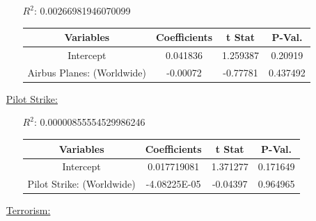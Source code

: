\documentclass[12pt]{report}
\begin{document}
\begin{enumerate}
\begin{samepage}
        \begin{enumerate}
            \item[$R^2$:]0.00266981946070099
            \item[]
                \begin{tabular}{|c|c|c|c|}

                \toprule \hline
                \textbf{Variables} & \textbf{Coefficients}  & \textbf{t Stat}& \textbf{P-Val.} \\ \hline

                Intercept & 0.041836 &  1.259387 &0.20919 \\ \hline
                Airbus Planes: (Worldwide) & -0.00072 &  -0.77781&0.437492 & \\ \hline
                \bottomrule
                \end{tabular}

        \end{enumerate}
\end{samepage}
    \item[\underline{Pilot Strike:}]
 \begin{samepage}


        \begin{enumerate}
            \item[$R^2$:]0.00000855554529986246
            \item[]
                \begin{tabular}{|c|c|c|c|}



        \toprule \hline
        \textbf{Variables} & \textbf{Coefficients}  & \textbf{t Stat} & \textbf{P-Val.}\\ \hline

        Intercept & 0.017719081 &  1.371277&0.171649 \\ \hline
        Pilot Strike: (Worldwide) & -4.08225E-05  & -0.04397 &0.964965 \\ \hline
        \bottomrule

                \end{tabular}

        \end{enumerate}
\end{samepage}

    \item[\underline{Terrorism:}]
\end{enumerate}
\end{document}
